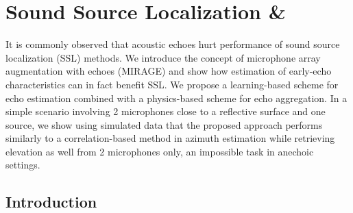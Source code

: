 \chapter{Sound Source Localization \& }\label{chap:mirage}

 It is commonly observed that acoustic echoes hurt performance of sound source localization (SSL) methods.
We introduce the concept of microphone array augmentation with echoes (MIRAGE) and
show how estimation of early-echo characteristics can in fact benefit SSL.
We propose a learning-based scheme for echo estimation combined with a physics-based scheme for echo aggregation.
In a simple scenario involving 2 microphones close to a reflective surface and one source,
we show using simulated data that the proposed approach performs similarly
to a correlation-based method in azimuth estimation while retrieving
elevation as well from 2 microphones only, an impossible task in anechoic settings.

\section{Introduction}






